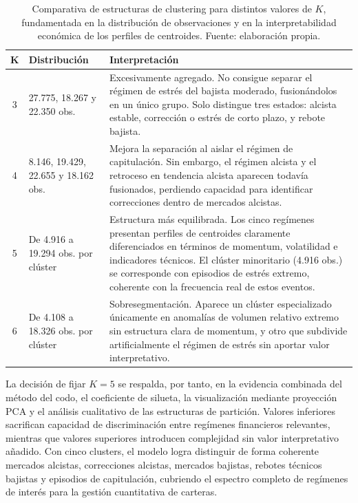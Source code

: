 \documentclass[
]{article}
\begin{document}
\begin{table}[H]
\centering
\small
\begin{tabular}{c p{2.2cm} p{9cm}}
\toprule
\textbf{K} & \textbf{Distribución} & \textbf{Interpretación} \\
\midrule
3 & 27.775, 18.267 y 22.350 obs. & Excesivamente agregado. No consigue separar el régimen de estrés del bajista moderado, fusionándolos en un único grupo. Solo distingue tres estados: alcista estable, corrección o estrés de corto plazo, y rebote bajista. \\
4 & 8.146, 19.429, 22.655 y 18.162 obs. & Mejora la separación al aislar el régimen de capitulación. Sin embargo, el régimen alcista y el retroceso en tendencia alcista aparecen todavía fusionados, perdiendo capacidad para identificar correcciones dentro de mercados alcistas. \\
5 & De 4.916 a 19.294 obs. por clúster & Estructura más equilibrada. Los cinco regímenes presentan perfiles de centroides claramente diferenciados en términos de momentum, volatilidad e indicadores técnicos. El clúster minoritario (4.916 obs.) se corresponde con episodios de estrés extremo, coherente con la frecuencia real de estos eventos. \\
6 & De 4.108 a 18.326 obs. por clúster & Sobresegmentación. Aparece un clúster especializado únicamente en anomalías de volumen relativo extremo sin estructura clara de momentum, y otro que subdivide artificialmente el régimen de estrés sin aportar valor interpretativo. \\
\bottomrule
\end{tabular}
\caption{Comparativa de estructuras de \gls{clustering} para distintos valores de $K$, fundamentada en la distribución de observaciones y en la interpretabilidad económica de los perfiles de centroides. Fuente: elaboración propia.}
\label{tab:kmeans_distribution}
\end{table}

La decisión de fijar $K=5$ se respalda, por tanto, en la evidencia combinada del método del codo, el coeficiente de silueta, la visualización mediante proyección PCA y el análisis cualitativo de las estructuras de partición. Valores inferiores sacrifican capacidad de discriminación entre regímenes financieros relevantes, mientras que valores superiores introducen complejidad sin valor interpretativo añadido. Con cinco clusters, el modelo logra distinguir de forma coherente mercados alcistas, correcciones alcistas, mercados bajistas, rebotes técnicos bajistas y episodios de capitulación, cubriendo el espectro completo de regímenes de interés para la gestión cuantitativa de carteras.
\end{document}
